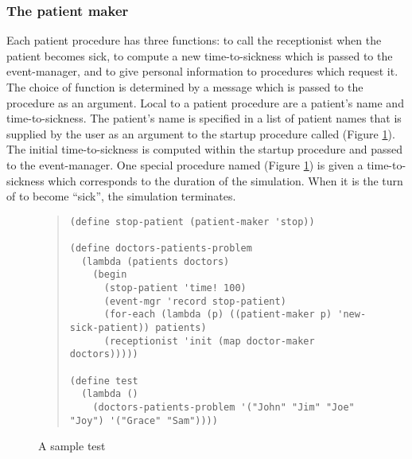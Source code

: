 \subsubsection{The patient maker}

Each patient procedure has three functions: to call the receptionist when
the patient becomes sick, to compute a new time-to-sickness which is
passed to the event-manager, and to give personal information to procedures
which request it. The choice of function is determined by a message which is
passed to the procedure as an argument. Local to a patient procedure are a
patient's name and time-to-sickness.  The patient's name is specified in a
list of patient names that is supplied by the user as an argument to the
startup procedure called 
(Figure \ref{fig:test}). The initial
time-to-sickness is computed within the startup procedure and passed to the
event-manager.  One special procedure named 
(Figure \ref{fig:test}) is given a
time-to-sickness which corresponds to the duration of the simulation.  When
it is the turn of  to become ``sick'', the simulation
terminates.

\begin{figure}
\begin{frameit}
\begin{quote}
\begin{verbatim}
(define stop-patient (patient-maker 'stop))

(define doctors-patients-problem
  (lambda (patients doctors)
    (begin
      (stop-patient 'time! 100)
      (event-mgr 'record stop-patient)
      (for-each (lambda (p) ((patient-maker p) 'new-sick-patient)) patients)
      (receptionist 'init (map doctor-maker doctors)))))

(define test
  (lambda ()                                                 
    (doctors-patients-problem '("John" "Jim" "Joe" "Joy") '("Grace" "Sam"))))
\end{verbatim}
\end{quote}
\caption{A sample test}
\label{fig:test}
\end{frameit}
\end{figure}

